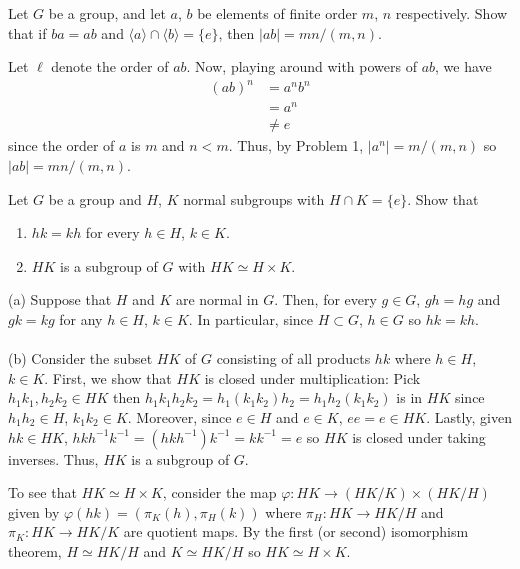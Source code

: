 \begin{problem}
  Let $G$ be a group, and let $a$, $b$ be elements of finite order $m$, $n$
  respectively. Show that if $ba=ab$ and
  $\langle a\rangle\cap\langle b\rangle=\{e\}$, then $|ab|=mn/(m,n)$.
\end{problem}
\begin{solution}
  Let $\ell$ denote the order of $ab$. Now, playing around with powers of
  $ab$, we have
  \begin{equation}
    \label{eq:1:4}
    \begin{aligned}
      (ab)^{n}
      &=a^nb^n\\
      &=a^n\\
      &\neq e
    \end{aligned}
  \end{equation}
  since the order of $a$ is $m$ and $n<m$. Thus, by Problem 1,
  $|a^n|=m/(m,n)$ so $|ab|=mn/(m,n)$.
\end{solution}

\begin{problem}
  Let $G$ be a group and $H$, $K$ normal subgroups with $H\cap
  K=\{e\}$. Show that
  \begin{enumerate}[label=(\alph*),noitemsep]
  \item $hk=kh$ for every $h\in H$, $k\in K$.
  \item $HK$ is a subgroup of $G$ with $HK\simeq H\times K$.
  \end{enumerate}
\end{problem}
\begin{solution}
  (a) Suppose that $H$ and $K$ are normal in $G$. Then, for every $g\in G$,
  $gh=hg$ and $gk=kg$ for any $h\in H$, $k\in K$. In particular, since
  $H\subset G$, $h\in G$ so $hk=kh$.
  \\\\
  (b) Consider the subset $HK$ of $G$ consisting of all products $hk$ where
  $h\in H$, $k\in K$. First, we show that $HK$ is closed under
  multiplication: Pick $h_1k_1,h_2k_2\in HK$ then
  $h_1k_1h_2k_2=h_1(k_1k_2)h_2=h_1h_2(k_1k_2)$ is in $HK$ since $h_1h_2\in
  H$, $k_1k_2\in K$. Moreover, since $e\in H$ and $e\in K$, $ee=e\in
  HK$. Lastly, given $hk\in HK$,
  $hkh^{-1}k^{-1}=(hkh^{-1})k^{-1}=kk^{-1}=e$ so $HK$ is closed under
  taking inverses. Thus, $HK$ is a subgroup of $G$.

  To see that $HK\simeq H\times K$, consider the map
  $\varphi\colon HK\to (HK/K)\times(HK/H)$ given by
  $\varphi(hk)=(\pi_K(h),\pi_H(k))$ where $\pi_H\colon HK\to HK/H$
  and $\pi_K\colon HK\to HK/K$ are quotient maps. By the first (or second)
  isomorphism theorem, $H\simeq HK/H$ and $K\simeq HK/H$ so $HK\simeq
  H\times K$.
\end{solution}

